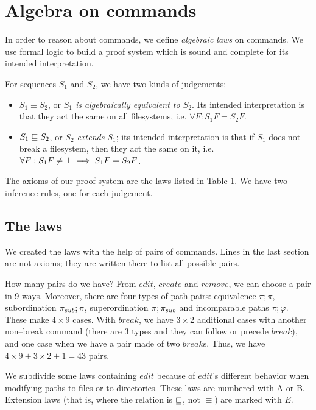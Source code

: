 \section{Algebra on commands}
\label{theorem:laws}

In order to reason about commands, we define \emph{algebraic laws} on
commands. We use formal logic to build a proof system which is sound and
complete for its intended interpretation.

For sequences \(S_1\) and \(S_2\), we have two kinds of judgements:
\begin{itemize}
\item \(S_1\equiv S_2\), or \emph{\(S_1\) is algebraically equivalent to
\(S_2\)}. Its intended interpretation is that they act the same on all
filesystems, i.e. \(\forall F: S_1F=S_2F\).
\item \(S_1\sqsubseteq S_2\), or \emph{\(S_2\) extends \(S_1\)}; its intended
interpretation is that if \(S_1\) does not break a filesystem, then they act
the same on it, i.e. \(\forall F: S_1F\ne\bot \implies S_1F=S_2F\).
\end{itemize}

The axioms of our proof system are the laws listed in Table 1. We have two
inference rules, one for each judgement.

\subsection{The laws}

We created the laws with the help of pairs of commands.
Lines in the last section are not axioms; they are written
there to list all possible pairs.

\begin{notrsi}
\medskip
{\small{
How many pairs do we have? 
From
\(edit\), \(create\) and \(remove\), we can choose a pair in 9 ways.
Moreover, there are four types of
path-pairs: equivalence \(\pi;\pi\), subordination \(\pi_{sub};\pi\),
superordination \(\pi;\pi_{sub}\)
and incomparable paths \(\pi;\varphi\). These make \(4\times9\) cases. With \(break\), we have
\(3\times 2\) additional cases
with another non--break command (there are 3 types and they can follow
or precede \(break\)), and one case when we have a pair made of two
\(break\)s. Thus, we have \(4\times 9+3\times2+1=43\) pairs. 
}}
\medskip
\end{notrsi}

We subdivide some laws containing \(edit\) because of \(edit\)'s different
behavior when modifying paths to files or to directories. These laws are
numbered with A or B.
Extension laws (that is, where the relation is \(\sqsubseteq\), not
\(\equiv\)) are marked with \(E\).

